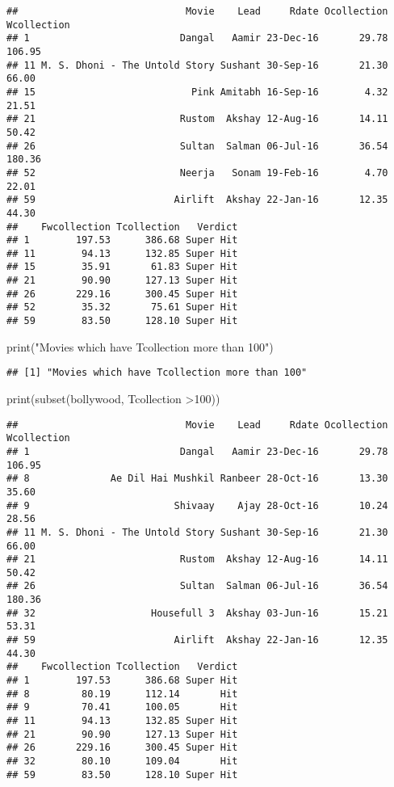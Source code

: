 \documentclass[
]{article}
\newenvironment{Shaded}{\begin{snugshade}}{\end{snugshade}}
\newcommand{\DecValTok}[1]{\textcolor[rgb]{0.00,0.00,0.81}{#1}}
\newcommand{\FunctionTok}[1]{\textcolor[rgb]{0.00,0.00,0.00}{#1}}
\newcommand{\NormalTok}[1]{#1}
\newcommand{\SpecialCharTok}[1]{\textcolor[rgb]{0.00,0.00,0.00}{#1}}
\newcommand{\StringTok}[1]{\textcolor[rgb]{0.31,0.60,0.02}{#1}}
\begin{document}
\begin{verbatim}
##                             Movie    Lead     Rdate Ocollection Wcollection
## 1                          Dangal   Aamir 23-Dec-16       29.78      106.95
## 11 M. S. Dhoni - The Untold Story Sushant 30-Sep-16       21.30       66.00
## 15                           Pink Amitabh 16-Sep-16        4.32       21.51
## 21                         Rustom  Akshay 12-Aug-16       14.11       50.42
## 26                         Sultan  Salman 06-Jul-16       36.54      180.36
## 52                         Neerja   Sonam 19-Feb-16        4.70       22.01
## 59                        Airlift  Akshay 22-Jan-16       12.35       44.30
##    Fwcollection Tcollection   Verdict
## 1        197.53      386.68 Super Hit
## 11        94.13      132.85 Super Hit
## 15        35.91       61.83 Super Hit
## 21        90.90      127.13 Super Hit
## 26       229.16      300.45 Super Hit
## 52        35.32       75.61 Super Hit
## 59        83.50      128.10 Super Hit
\end{verbatim}

\begin{Shaded}
\begin{Highlighting}[]
\FunctionTok{print}\NormalTok{(}\StringTok{"Movies which have Tcollection more than 100"}\NormalTok{)}
\end{Highlighting}
\end{Shaded}

\begin{verbatim}
## [1] "Movies which have Tcollection more than 100"
\end{verbatim}

\begin{Shaded}
\begin{Highlighting}[]
\FunctionTok{print}\NormalTok{(}\FunctionTok{subset}\NormalTok{(bollywood, Tcollection }\SpecialCharTok{\textgreater{}}\DecValTok{100}\NormalTok{))}
\end{Highlighting}
\end{Shaded}

\begin{verbatim}
##                             Movie    Lead     Rdate Ocollection Wcollection
## 1                          Dangal   Aamir 23-Dec-16       29.78      106.95
## 8              Ae Dil Hai Mushkil Ranbeer 28-Oct-16       13.30       35.60
## 9                         Shivaay    Ajay 28-Oct-16       10.24       28.56
## 11 M. S. Dhoni - The Untold Story Sushant 30-Sep-16       21.30       66.00
## 21                         Rustom  Akshay 12-Aug-16       14.11       50.42
## 26                         Sultan  Salman 06-Jul-16       36.54      180.36
## 32                    Housefull 3  Akshay 03-Jun-16       15.21       53.31
## 59                        Airlift  Akshay 22-Jan-16       12.35       44.30
##    Fwcollection Tcollection   Verdict
## 1        197.53      386.68 Super Hit
## 8         80.19      112.14       Hit
## 9         70.41      100.05       Hit
## 11        94.13      132.85 Super Hit
## 21        90.90      127.13 Super Hit
## 26       229.16      300.45 Super Hit
## 32        80.10      109.04       Hit
## 59        83.50      128.10 Super Hit
\end{verbatim}
\end{document}
